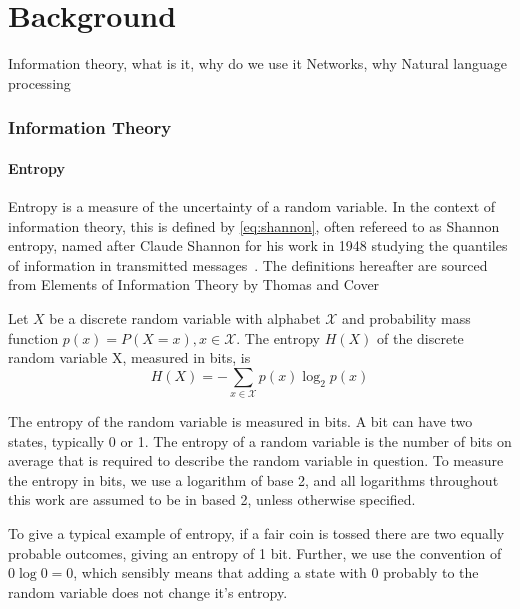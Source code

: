 \chapter{Background \label{ch:background}}

Information theory, what is it, why do we use it
Networks, why
Natural language processing


\subsection{Information Theory}
\subsubsection{Entropy}
Entropy is a measure of the uncertainty of a random variable. In the context of information theory, this is defined by \autoref{eq:shannon}, often refereed to as Shannon entropy, named after Claude Shannon for his work in 1948 studying the quantiles of information in transmitted messages~. The definitions hereafter are sourced from Elements of Information Theory by Thomas and Cover  

\begin{definition}
	Let $X$ be a discrete random variable with alphabet $\mathcal{X}$ and probability mass function $p(x) = P(X = x), x \in \mathcal{X}$.
	The entropy $H(X)$ of the discrete random variable X, measured in bits, is 
	\begin{equation}\label{eq:shannon}
	H(X)=-\sum_{x \in \mathcal{X}} p(x) \log_2 p(x)
	\end{equation}
\end{definition} 

The entropy of the random variable is measured in bits. A bit can have two states, typically 0 or 1. The entropy of a random variable is the number of bits on average that is required to describe the random variable in question. To measure the entropy in bits, we use a logarithm of base 2, and all logarithms throughout this work are assumed to be in based 2, unless otherwise specified.

To give a typical example of entropy, if a fair coin is tossed there are two equally probable outcomes, giving an entropy of 1 bit. Further, we use the convention of $0\log 0 = 0$, which sensibly means that adding a state with 0 probably to the random variable does not change it's entropy.

